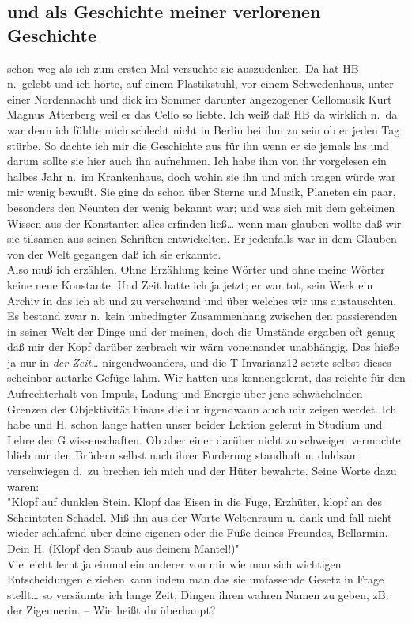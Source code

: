 \documentclass[
]{article}
\author{}
\date{\vspace{-2.5em}}
\begin{document}
\subsection{und als Geschichte meiner verlorenen
Geschichte}\label{und-als-geschichte-meiner-verlorenen-geschichte}

schon weg als ich zum ersten Mal versuchte sie auszudenken. Da hat HB
n.~gelebt und ich hörte, auf einem Plastikstuhl, vor einem Schwedenhaus,
unter einer Nordennacht und dick im Sommer darunter angezogener
Cellomusik Kurt Magnus Atterberg weil er das Cello so liebte. Ich weiß
daß HB da wirklich n.~da war denn ich fühlte mich schlecht nicht in
Berlin bei ihm zu sein ob er jeden Tag stürbe. So dachte ich mir die
Geschichte aus für ihn wenn er sie jemals las und darum sollte sie hier
auch ihn aufnehmen. Ich habe ihm von ihr vorgelesen ein halbes Jahr
n.~im Krankenhaus, doch wohin sie ihn und mich tragen würde war mir
wenig bewußt. Sie ging da schon über Sterne und Musik, Planeten ein
paar, besonders den Neunten der wenig bekannt war; und was sich mit dem
geheimen Wissen aus der Konstanten alles erfinden ließ\ldots{} wenn man
glauben wollte daß wir sie tilsamen aus seinen Schriften entwickelten.
Er jedenfalls war in dem Glauben von der Welt gegangen daß ich sie
erkannte.\\
Also muß ich erzählen. Ohne Erzählung keine Wörter und ohne meine Wörter
keine neue Konstante. Und Zeit hatte ich ja jetzt; er war tot, sein Werk
ein Archiv in das ich ab und zu verschwand und über welches wir uns
austauschten. Es bestand zwar n.~kein unbedingter Zusammenhang zwischen
den passierenden in seiner Welt der Dinge und der meinen, doch die
Umstände ergaben oft genug daß mir der Kopf darüber zerbrach wir wärn
voneinander unabhängig. Das hieße ja nur in \emph{der Zeit\ldots{}}
nirgendwoanders, und die T-Invarianz12 setzte selbst dieses scheinbar
autarke Gefüge lahm. Wir hatten uns kennengelernt, das reichte für den
Aufrechterhalt von Impuls, Ladung und Energie über jene schwächelnden
Grenzen der Objektivität hinaus die ihr irgendwann auch mir zeigen
werdet. Ich habe und H. schon lange hatten unser beider Lektion gelernt
in Studium und Lehre der G.wissenschaften. Ob aber einer darüber nicht
zu schweigen vermochte blieb nur den Brüdern selbst nach ihrer Forderung
standhaft u. duldsam verschwiegen d.~zu brechen ich mich und der Hüter
bewahrte. Seine Worte dazu waren:\\
"Klopf auf dunklen Stein. Klopf das Eisen in die Fuge, Erzhüter, klopf
an des Scheintoten Schädel. Miß ihn aus der Worte Weltenraum u. dank und
fall nicht wieder schlafend über deine eigenen oder die Füße deines
Freundes, Bellarmin. Dein H. (Klopf den Staub aus deinem Mantel!)"\\
Vielleicht lernt ja einmal ein anderer von mir wie man sich wichtigen
Entscheidungen e.ziehen kann indem man das sie umfassende Gesetz in
Frage stellt\ldots{} so versäumte ich lange Zeit, Dingen ihren wahren
Namen zu geben, zB. der Zigeunerin. -- Wie heißt du überhaupt?
\end{document}
